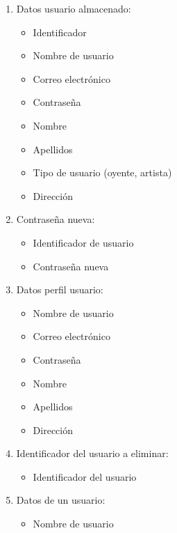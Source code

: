 \documentclass[12pt,a4paper]{article}
\begin{document}
\begin{enumerate}[label=\textnormal{RD\arabic*}]
	\item Datos usuario almacenado: \label{rd20}
		\begin{itemize}
			\item Identificador
			\item Nombre de usuario
			\item Correo electrónico
			\item Contraseña
			\item Nombre
			\item Apellidos
			\item Tipo de usuario (oyente, artista)
			\item Dirección
		\end{itemize}
		
	\item Contraseña nueva: \label{rd21}
		\begin{itemize}
			\item Identificador de usuario
			\item Contraseña nueva
		\end{itemize}
		
	\item Datos perfil usuario: \label{rd22}
		\begin{itemize}
			\item Nombre de usuario
			\item Correo electrónico
			\item Contraseña
			\item Nombre
			\item Apellidos
			\item Dirección
		\end{itemize}
		
	\item Identificador del usuario a eliminar: \label{rd23}
		\begin{itemize}
			\item Identificador del usuario
		\end{itemize}
		
		
	\item Datos de un usuario:  \label{rd24}
		\begin{itemize}
			\item Nombre de usuario
		\end{itemize}


\end{enumerate}
\end{document}
